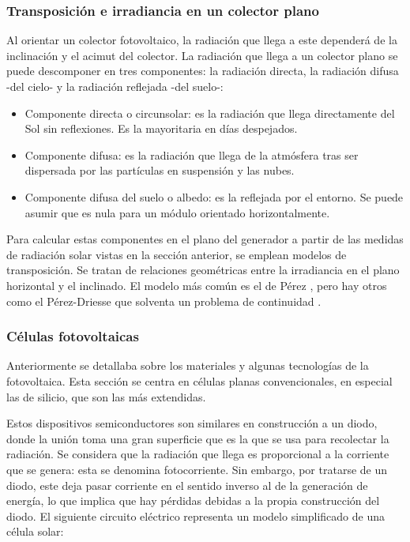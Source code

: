 \subsubsection{Transposición e irradiancia en un colector plano}

Al orientar un colector fotovoltaico, la radiación que llega a este dependerá de la inclinación y el \gls{acimut} del colector. La radiación que llega a un colector plano se puede descomponer en tres componentes: la radiación \gls{directa}, la radiación \gls{difusa} -del cielo- y la radiación \gls{reflejada} -del suelo-:

\begin{itemize}
      \item Componente \gls{directa} o circunsolar: es la radiación que llega directamente del Sol sin reflexiones. Es la mayoritaria en días despejados.
      \item Componente difusa: es la radiación que llega de la atmósfera tras ser dispersada por las partículas en suspensión y las nubes.
      \item Componente difusa del suelo o albedo: es la reflejada por el entorno. Se puede asumir que es nula para un \gls{módulo} orientado horizontalmente.
\end{itemize}

Para calcular estas componentes en el plano del generador a partir de las medidas de radiación solar vistas en la sección anterior, se emplean modelos de \gls{transposición}. Se tratan de relaciones geométricas entre la \gls{irradiancia} en el plano horizontal y el inclinado. El \gls{modelo} más común es el de Pérez \cite{Perez_Ineichen_Seals_Michalsky_Stewart_1990}, pero hay otros como el Pérez-Driesse que solventa un problema de continuidad \cite{Driesse_Jensen_Perez_2024}.

\subsubsection{Células fotovoltaicas}

Anteriormente se detallaba sobre los materiales y algunas tecnologías de la fotovoltaica. Esta sección se centra en células planas convencionales, en especial las de silicio, que son las más extendidas.

Estos dispositivos semiconductores son similares en construcción a un \gls{diodo}, donde la unión toma una gran superficie que es la que se usa para recolectar la radiación. Se considera que la radiación que llega es proporcional a la corriente que se genera: esta se denomina fotocorriente. Sin embargo, por tratarse de un \gls{diodo}, este deja pasar corriente en el sentido inverso al de la generación de energía, lo que implica que hay pérdidas debidas a la propia construcción del \gls{diodo}. El siguiente circuito eléctrico representa un \gls{modelo} simplificado de una célula solar:

